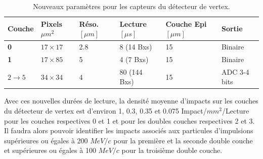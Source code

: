  \begin{table}[h]
   \small
   \centering
    \begin{tabular}{|l|l|l|l|l|l|}
     \hline
     \textbf{Couche}            & \textbf{Pixels $\mu m^2$} & \textbf{R\'eso. $[\mu m]$} & \textbf{Lecture $[\mu s]$} & \textbf{Couche Epi $[\mu m]$} & \textbf{Sortie} \\ \hline
     \textbf{0}                 & $17 \times 17$  & 2.8                           & 8 (14 Bxs)                    & 15                            & Binaire         \\ \hline
     \textbf{1}                 & $17 \times 85$  & 5                             & 4 (7 Bxs)                     & 15                            & Binaire         \\ \hline
     $2 \rightarrow 5$ & $34 \times 34$  & 4                             & 80 (144 Bxs)                  & 15                            & ADC 3-4 bits    \\ \hline
    \end{tabular}
    \caption{Nouveaux param\`etres pour les capteurs du d\'etecteur de vertex.}
    \label{tab:new_param_sensors_perspectives}
   \end{table}
  
  Avec ces nouvelles dur\'ees de lecture, la densit\'e moyenne d'impacts sur les couches du d\'etecteur de vertex est d'environ 1, 0.3, 0.35 et 0.075 Impact/$mm^2$/Lecture pour les couches respectives 0 et 1 et pour les doubles couches respectives 2 et 3. Il faudra alors pouvoir identifier les impacts associ\'es aux particules d'impulsions sup\'erieures ou \'egales \`a 200 $MeV/c$ pour la premi\`ere et la seconde double couche et sup\'erieures ou \'egales \`a 100 $MeV/c$ pour la troisi\`eme double couche.
  
  \medskip
  
